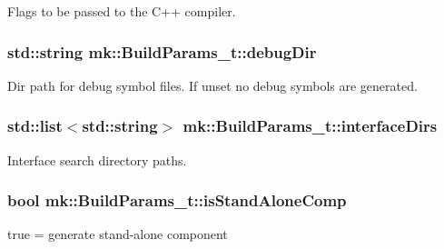 Flags to be passed to the C++ compiler. 

\subsubsection[{\texorpdfstring{debug\+Dir}{debugDir}}]{\setlength{\rightskip}{0pt plus 5cm}std\+::string mk\+::\+Build\+Params\+\_\+t\+::debug\+Dir}\hypertarget{structmk_1_1_build_params__t_a31f61e0b4f096c8f1054cef051b4c7ef}{}\label{structmk_1_1_build_params__t_a31f61e0b4f096c8f1054cef051b4c7ef}
Dir path for debug symbol files. If unset no debug symbols are generated. 
\subsubsection[{\texorpdfstring{interface\+Dirs}{interfaceDirs}}]{\setlength{\rightskip}{0pt plus 5cm}std\+::list$<$std\+::string$>$ mk\+::\+Build\+Params\+\_\+t\+::interface\+Dirs}\hypertarget{structmk_1_1_build_params__t_a8758dc3212617e083cd85f76d63105ff}{}\label{structmk_1_1_build_params__t_a8758dc3212617e083cd85f76d63105ff}


Interface search directory paths. 

\subsubsection[{\texorpdfstring{is\+Stand\+Alone\+Comp}{isStandAloneComp}}]{\setlength{\rightskip}{0pt plus 5cm}bool mk\+::\+Build\+Params\+\_\+t\+::is\+Stand\+Alone\+Comp}\hypertarget{structmk_1_1_build_params__t_a324442877f22ea53dc3ffd9a9a485f86}{}\label{structmk_1_1_build_params__t_a324442877f22ea53dc3ffd9a9a485f86}


true = generate stand-\/alone component 

